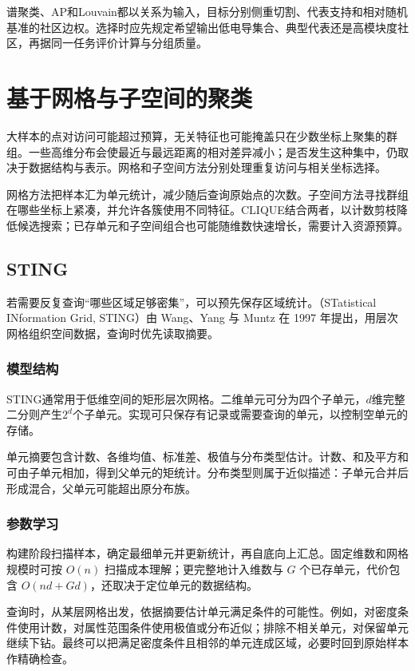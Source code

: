 谱聚类、AP和Louvain都以关系为输入，目标分别侧重切割、代表支持和相对随机基准的社区边权。选择时应先规定希望输出低电导集合、典型代表还是高模块度社区，再据同一任务评价计算与分组质量。

\section{基于网格与子空间的聚类}
\label{sec:clustering-subspace}

大样本的点对访问可能超过预算，无关特征也可能掩盖只在少数坐标上聚集的群组。一些高维分布会使最近与最远距离的相对差异减小；是否发生这种集中，仍取决于数据结构与表示。网格和子空间方法分别处理重复访问与相关坐标选择。

网格方法把样本汇为单元统计，减少随后查询原始点的次数。子空间方法寻找群组在哪些坐标上紧凑，并允许各簇使用不同特征。CLIQUE结合两者，以计数剪枝降低候选搜索；已存单元和子空间组合也可能随维数快速增长，需要计入资源预算。

\subsection{STING}

若需要反复查询“哪些区域足够密集”，可以预先保存区域统计。（STatistical INformation Grid, STING）由 Wang、Yang 与 Muntz 在 1997 年提出，用层次网格组织空间数据，查询时优先读取摘要。

\subsubsection{模型结构}

STING通常用于低维空间的矩形层次网格。二维单元可分为四个子单元，$d$维完整二分则产生$2^d$个子单元。实现可只保存有记录或需要查询的单元，以控制空单元的存储。

单元摘要包含计数、各维均值、标准差、极值与分布类型估计。计数、和及平方和可由子单元相加，得到父单元的矩统计。分布类型则属于近似描述：子单元合并后形成混合，父单元可能超出原分布族。

\subsubsection{参数学习}

构建阶段扫描样本，确定最细单元并更新统计，再自底向上汇总。固定维数和网格规模时可按 $O(n)$ 扫描成本理解；更完整地计入维数与 $G$ 个已存单元，代价包含 $O(nd+Gd)$，还取决于定位单元的数据结构。

查询时，从某层网格出发，依据摘要估计单元满足条件的可能性。例如，对密度条件使用计数，对属性范围条件使用极值或分布近似；排除不相关单元，对保留单元继续下钻。最终可以把满足密度条件且相邻的单元连成区域，必要时回到原始样本作精确检查。

